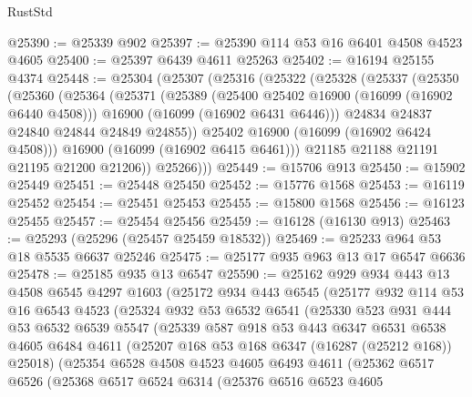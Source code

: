\begin{lexlean}{RustStd}
\begin{coremodule}
@25390 := @25339 @902
@25397 := @25390 @114 @53 @16 @6401 @4508 @4523 @4605
@25400 := @25397 @6439 @4611 @25263
@25402 := @16194 @25155 @4374
@25448 := @25304
    (@25307
      (@25316
        (@25322
          (@25328
            (@25337
              (@25350
                (@25360
                  (@25364
                    (@25371
                      (@25389
                        (@25400 @25402 @16900 (@16099 (@16902 @6440 @4508)))
                        @16900
                        (@16099 (@16902 @6431 @6446)))
                      @24834
                      @24837
                      @24840
                      @24844
                      @24849
                      @24855))
                  @25402
                  @16900
                  (@16099 (@16902 @6424 @4508)))
                @16900
                (@16099 (@16902 @6415 @6461)))
              @21185
              @21188
              @21191
              @21195
              @21200
              @21206))
          @25266)))
@25449 := @15706 @913
@25450 := @15902 @25449
@25451 := @25448 @25450
@25452 := @15776 @1568
@25453 := @16119 @25452
@25454 := @25451 @25453
@25455 := @15800 @1568
@25456 := @16123 @25455
@25457 := @25454 @25456
@25459 := @16128 (@16130 @913)
@25463 := @25293 (@25296 (@25457 @25459 @18532))
@25469 := @25233 @964 @53 @18 @5535 @6637 @25246
@25475 := @25177 @935 @963 @13 @17 @6547 @6636
@25478 := @25185 @935 @13 @6547
@25590 := @25162
    @929
    @934
    @443
    @13
    @4508
    @6545
    @4297
    @1603
    (@25172
      @934
      @443
      @6545
      (@25177
        @932
        @114
        @53
        @16
        @6543
        @4523
        (@25324
          @932
          @53
          @6532
          @6541
          (@25330
            @523
            @931
            @444
            @53
            @6532
            @6539
            @5547
            (@25339
              @587
              @918
              @53
              @443
              @6347
              @6531
              @6538
              @4605
              @6484
              @4611
              (@25207 @168 @53 @168 @6347 (@16287 (@25212 @168)) @25018)
              (@25354
                @6528
                @4508
                @4523
                @4605
                @6493
                @4611
                (@25362
                  @6517
                  @6526
                  (@25368
                    @6517
                    @6524
                    @6314
                    (@25376
                      @6516
                      @6523
                      @4605

\end{coremodule}
\end{lexlean}
